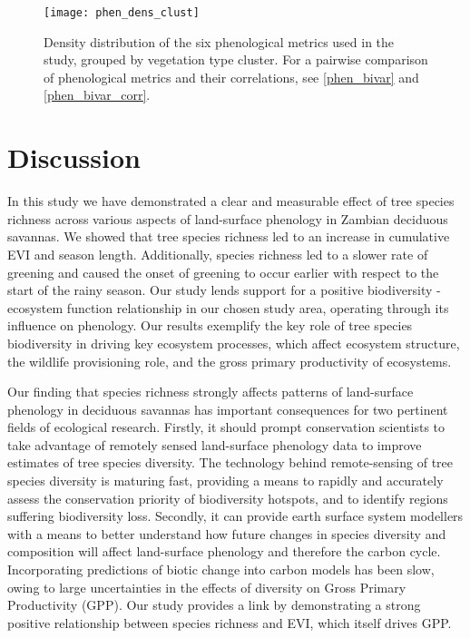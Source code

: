 \documentclass[11pt,a4paper]{article}
\begin{document}
\begin{figure}[H]
\centering
	\texttt{[image: phen\_dens\_clust]}
	\caption{Density distribution of the six phenological metrics used in the
	study, grouped by vegetation type cluster. For a pairwise comparison of
phenological metrics and their correlations, see \autoref{phen_bivar} and
\autoref{phen_bivar_corr}.}
	\label{phen_dens_clust}
\end{figure}

\section{Discussion}

In this study we have demonstrated a clear and measurable effect of tree species
richness across various aspects of land-surface phenology in Zambian deciduous
savannas. We showed that tree species richness led to an increase in cumulative
EVI and season length. Additionally, species richness led to a slower rate of
greening and caused the onset of greening to occur earlier with respect to the
start of the rainy season. Our study lends support for a positive biodiversity -
ecosystem function relationship in our chosen study area, operating through its
influence on phenology. Our results exemplify the key role of tree species
biodiversity in driving key ecosystem processes, which affect ecosystem
structure, the wildlife provisioning role, and the gross primary productivity of
ecosystems.

Our finding that species richness strongly affects patterns of land-surface
phenology in deciduous savannas has important consequences for two pertinent fields of ecological
research. Firstly, it should prompt conservation scientists to take advantage 
of remotely sensed land-surface phenology data to improve estimates of tree
species diversity. The technology behind remote-sensing of tree species
diversity is maturing fast, providing a means to rapidly and accurately assess
the conservation priority of biodiversity hotspots, and to identify regions
suffering biodiversity loss. Secondly, it can provide earth surface system
modellers with a means to better understand how future changes in species diversity 
and composition will affect land-surface phenology and therefore the carbon
cycle. Incorporating predictions of biotic change into carbon models has been
slow, owing to large uncertainties in the effects of diversity on Gross Primary
Productivity (GPP). Our study provides a link by demonstrating a strong positive 
relationship between species richness and EVI, which itself drives GPP.
\end{document}

